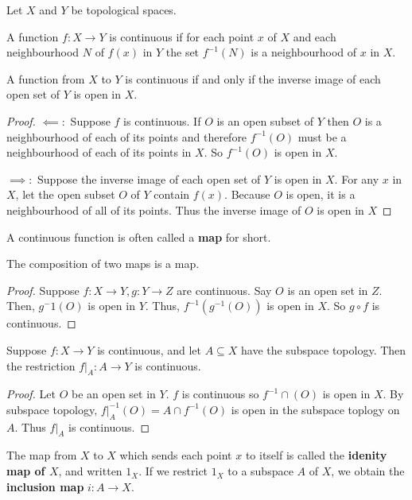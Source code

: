 \begin{note}
    Let $X$ and $Y$ be topological spaces.
\end{note}
\begin{remark}
    A function $f\colon X\to Y$ is continuous if for each point $x$ of $X$ and each neighbourhood $N$ of $f(x)$ in $Y$ the set $f^{-1}(N)$ is a neighbourhood of $x$ in $X$.
\end{remark}
\begin{theorem}[Continuity]
    A function from $X$ to $Y$ is continuous if and only if the inverse image of each open set of $Y$ is open in $X$.
\end{theorem}
\begin{proof}
    $\impliedby\colon$ Suppose $f$ is continuous. If $O$ is an open subset of $Y$ then $O$ is a neighbourhood of each of its points and therefore $f^{-1}(O)$ must be a neighbourhood of each of its points in $X$. So $f^{-1}(O)$ is open in $X$. 

    $\implies\colon$ Suppose the inverse image of each open set of $Y$ is open in $X$. For any $x$ in $X$, let the open subset $O$ of $Y$ contain $f(x)$. Because $O$ is open, it is a neighbourhood of all of its points. Thus the inverse image of $O$ is open in $X$
\end{proof}
\begin{definition}[Map]
    A continuous function is often called a \textbf{map} for short.
\end{definition}
\begin{theorem}
    The composition of two maps is a map.
\end{theorem}
\begin{proof}
    Suppose $f\colon X\to Y, g\colon Y\to Z$ are continuous. Say $O$ is an open set in $Z$. Then, $g^-1(O)$ is open in $Y$. Thus, $f^{-1}(g^{-1}(O))$ is open in $X$. So $g\circ f$ is continuous.
\end{proof}
\begin{theorem}
    Suppose $f\colon X\to Y$ is continuous, and let $A \subseteq X$ have the subspace topology. Then the restriction $f\vert_A\colon A\to Y$ is continuous.
\end{theorem}
\begin{proof}
    Let $O$ be an open set in $Y$. $f$ is continuous so $f^{-1}\cap(O)$ is open in $X$. By subspace topology, $f\vert_A^{-1}(O) = A\cap f^{-1}(O)$ is open in the subspace toplogy on $A$. Thus $f\vert_A$ is continuous.
\end{proof}
\begin{definition}
    The map from $X$ to $X$ which sends each point $x$ to itself is called the \textbf{idenity map of $X$}, and written $1_X$. If we restrict $1_X$ to a subspace $A$ of $X$, we obtain the \textbf{inclusion map} $i\colon A\to X$.
\end{definition}
